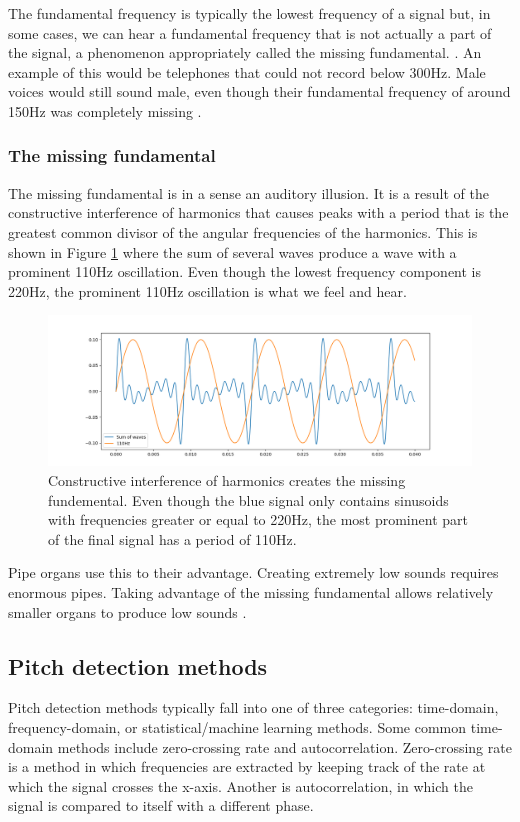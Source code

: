 The fundamental frequency is typically the lowest frequency of a signal but, in some cases, we can hear a fundamental frequency that is not actually a part of the signal, a phenomenon appropriately called the missing fundamental. \cite{Gotsopoulos}. An example of this would be telephones that could not record below 300Hz. Male voices would still sound male, even though their fundamental frequency of around 150Hz was completely missing .

\subsubsection{The missing fundamental}
The missing fundamental is in a sense an auditory illusion. It is a result of the constructive interference of harmonics that causes peaks with a period that is the greatest common divisor of the angular frequencies of the harmonics. This is shown in Figure \ref{fig:missingfund} where the sum of several waves produce a wave with a prominent 110Hz oscillation. Even though the lowest frequency component is 220Hz, the prominent 110Hz oscillation is what we feel and hear.

\begin{figure}[ht]
    \centering
    \includegraphics[width=\textwidth]{./images/missingfund.png}
    \caption{Constructive interference of harmonics creates the missing fundemental. Even though the blue signal only contains sinusoids with frequencies greater or equal to 220Hz, the most prominent part of the final signal has a period of 110Hz. \label{fig:missingfund}}
\end{figure}

Pipe organs use this to their advantage. Creating extremely low sounds requires enormous pipes. Taking advantage of the missing fundamental allows relatively smaller organs to produce low sounds \cite{Veritasium2024}.

\subsection{Pitch detection methods}
Pitch detection methods typically fall into one of three categories: time-domain, frequency-domain, or statistical/machine learning methods. Some common time-domain methods include zero-crossing rate and autocorrelation. Zero-crossing rate is a method in which frequencies are extracted by keeping track of the rate at which the signal crosses the x-axis. Another is autocorrelation, in which the signal is compared to itself with a different phase. 

